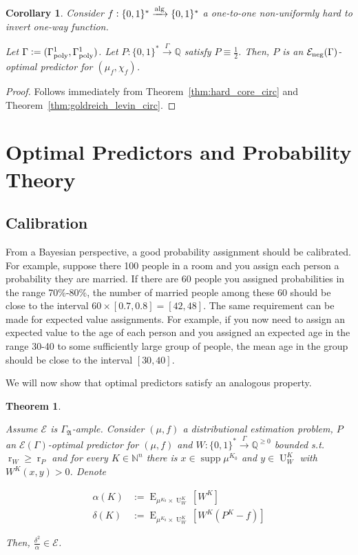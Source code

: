 \documentclass{article}
\numberwithin{equation}{section}
\theoremstyle{definition}
\theoremstyle{plain}
\newtheorem{theorem}{Theorem}[section]
\newtheorem{corollary}{Corollary}[section]
\newcommand{\Bool}{\{0,1\}}
\newcommand{\Words}{{\Bool^*}}
\DeclareMathOperator{\Supp}{supp}
\DeclareMathOperator{\E}{E}
\DeclareMathOperator{\R}{r}
\DeclareMathOperator{\Un}{U}
\newcommand{\Nats}{\mathbb{N}}
\newcommand{\Rats}{\mathbb{Q}}
\newcommand{\GrowA}{\Gamma_{\mathfrak{A}}}
\newcommand{\Fall}{\mathcal{E}}
\newcommand{\EG}{\Fall(\Gamma)}
\newcommand{\Alg}{\xrightarrow{\textnormal{alg}}}
\newcommand{\Scheme}{\xrightarrow{\Gamma}}
\begin{document}
\begin{corollary}

Consider $f: \Words \Alg \Words$ a one-to-one non-uniformly hard to invert one-way function.

Let $\Gamma:=(\Gamma_{\textnormal{poly}}^1,\Gamma_{\textnormal{poly}}^1)$. Let $P: \Words \Scheme \Rats$ satisfy $P \equiv \frac{1}{2}$. Then, $P$ is an $\Fall_{\textnormal{neg}}(\Gamma)$-optimal predictor for $(\mu_f, \chi_f)$.

\end{corollary}

\begin{proof}

Follows immediately from Theorem~\ref{thm:hard_core_circ} and Theorem~\ref{thm:goldreich_levin_circ}.
\end{proof}

\section{Optimal Predictors and Probability Theory}
\label{sec:probability}

\subsection{Calibration}

From a Bayesian perspective, a good probability assignment should be calibrated. For example, suppose there 100 people in a room and you assign each person a probability they are married. If there are 60 people you assigned probabilities in the range 70\%-80\%, the number of married people among these 60 should be close to the interval $60 \times [0.7, 0.8] = [42,48]$. The same requirement can be made for expected value assignments. For example, if you now need to assign an expected value to the age of each person and you assigned an expected age in the range 30-40 to some sufficiently large group of people, the mean age in the group should be close to the interval $[30,40]$. 

We will now show that optimal predictors satisfy an analogous property.

\begin{theorem}
\label{thm:calib}

Assume $\Fall$ is $\GrowA$-ample. Consider $(\mu,f)$ a distributional estimation problem, $P$ an $\EG$-optimal predictor for $(\mu,f)$ and ${W: \Words \Scheme \Rats^{\geq 0}}$ bounded s.t. $\R_W \geq \R_P$ and for every $K \in \Nats^n$ there is $x \in \Supp \mu^{K_0}$ and $y \in \Un_W^{K}$ with $W^{K}(x,y) > 0$. Denote

\begin{align*}
\alpha(K)&:=\E_{\mu^{K_0} \times \Un_W^{K}}[W^{K}] \\ 
\delta(K)&:=\E_{\mu^{K_0} \times \Un_W^{K}}[W^{K}(P^{K}-f)]
\end{align*} 

Then, $\frac{\delta^2}{\alpha} \in \Fall$.

\end{theorem}
\end{document}

